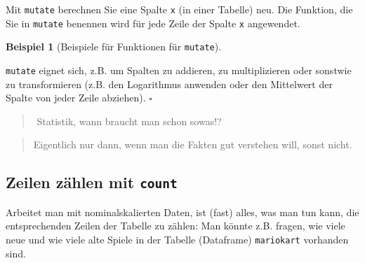 \documentclass[
  a4paper,
]{scrbook}
\theoremstyle{definition}
\newtheorem{example}{Beispiel}[chapter]
\theoremstyle{definition}
\theoremstyle{definition}
\theoremstyle{remark}
\begin{document}
Mit \texttt{mutate} berechnen Sie eine Spalte \texttt{x} (in einer
Tabelle) neu. Die Funktion, die Sie in \texttt{mutate} benennen wird für
jede Zeile der Spalte \texttt{x} angewendet.

\begin{example}[Beispiele für Funktionen für
\texttt{mutate}]\protect\hypertarget{exm-mutate2}{}\label{exm-mutate2}

\texttt{mutate} eignet sich, z.B. um Spalten zu addieren, zu
multiplizieren oder sonstwie zu transformieren (z.B. den Logarithmus
anwenden oder den Mittelwert der Spalte von jeder Zeile abziehen).
\(\square\)

\end{example}

\begin{quote}
{}️ Statistik, wann braucht man schon sowas!?
\end{quote}

\begin{quote}
{} Eigentlich nur dann, wenn man die Fakten gut verstehen
will, sonst nicht.
\end{quote}

\subsection{\texorpdfstring{Zeilen zählen mit
\texttt{count}}{Zeilen zählen mit count}}\label{zeilen-zuxe4hlen-mit-count}

Arbeitet man mit nominalskalierten Daten, ist (fast) alles, was man tun
kann, die entsprechenden Zeilen der Tabelle zu zählen: Man könnte z.B.
fragen, wie viele neue und wie viele alte Spiele in der Tabelle
(Dataframe) \texttt{mariokart} vorhanden sind.
\end{document}
